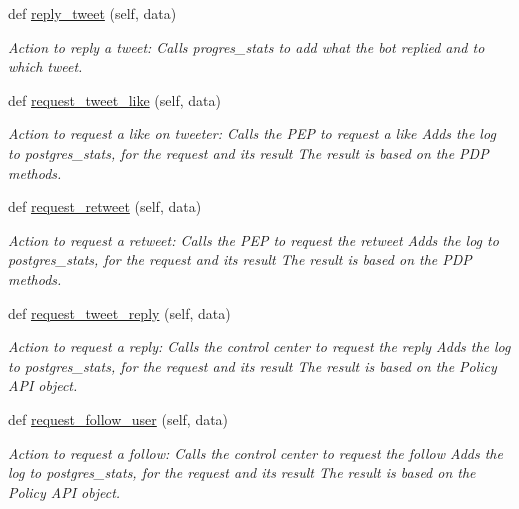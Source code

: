 \begin{DoxyCompactItemize}
def \hyperlink{classtwitter_1_1control__center_1_1dbwriter_1_1DBWriter_a1005772e640f1c4aae538a7850c2d15d}{reply\+\_\+tweet} (self, data)
\begin{DoxyCompactList}\small\item\em Action to reply a tweet\+: Calls progres\+\_\+stats to add what the bot replied and to which tweet. \end{DoxyCompactList}\item 
def \hyperlink{classtwitter_1_1control__center_1_1dbwriter_1_1DBWriter_acb9c768e2862639056ef226e2eab77ec}{request\+\_\+tweet\+\_\+like} (self, data)
\begin{DoxyCompactList}\small\item\em Action to request a like on tweeter\+: Calls the P\+EP to request a like Adds the log to postgres\+\_\+stats, for the request and its result The result is based on the P\+DP methods. \end{DoxyCompactList}\item 
def \hyperlink{classtwitter_1_1control__center_1_1dbwriter_1_1DBWriter_af94a869d95d271c9fc1d23b9281c95a9}{request\+\_\+retweet} (self, data)
\begin{DoxyCompactList}\small\item\em Action to request a retweet\+: Calls the P\+EP to request the retweet Adds the log to postgres\+\_\+stats, for the request and its result The result is based on the P\+DP methods. \end{DoxyCompactList}\item 
def \hyperlink{classtwitter_1_1control__center_1_1dbwriter_1_1DBWriter_a876d7b694fb3f54940e7f07afcbb0c09}{request\+\_\+tweet\+\_\+reply} (self, data)
\begin{DoxyCompactList}\small\item\em Action to request a reply\+: Calls the control center to request the reply Adds the log to postgres\+\_\+stats, for the request and its result The result is based on the Policy A\+PI object. \end{DoxyCompactList}\item 
def \hyperlink{classtwitter_1_1control__center_1_1dbwriter_1_1DBWriter_a957daaa2da31d56fc7dccb9a18f3346d}{request\+\_\+follow\+\_\+user} (self, data)
\begin{DoxyCompactList}\small\item\em Action to request a follow\+: Calls the control center to request the follow Adds the log to postgres\+\_\+stats, for the request and its result The result is based on the Policy A\+PI object. \end{DoxyCompactList}\item 

\end{DoxyCompactItemize}
